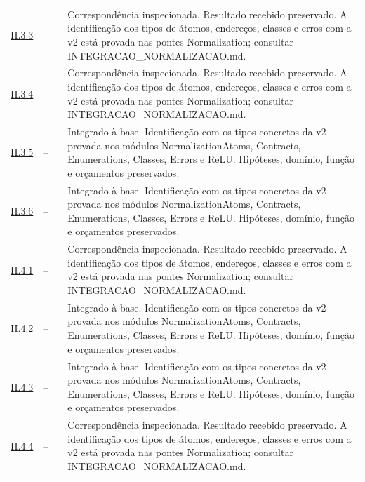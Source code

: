 \documentclass[12pt,a4paper]{article}
\theoremstyle{preciso}
\theoremstyle{definition}
\theoremstyle{preciso}
\theoremstyle{preciso}
\theoremstyle{preciso}
\theoremstyle{preciso}
\theoremstyle{definition}
\theoremstyle{preciso}
\theoremstyle{definition}
\theoremstyle{preciso}
\theoremstyle{preciso}
\theoremstyle{definition}
\begin{document}
\begin{singlespace}
\begin{longtable}{@{}p{.11\linewidth}p{.09\linewidth}p{.09\linewidth}p{.59\linewidth}@{}}
\hyperref[map:normalizacao:3.3]{II.3.3} & -- & \pageref{map:normalizacao:3.3} & Correspondência inspecionada. Resultado recebido preservado. A identificação dos tipos de átomos, endereços, classes e erros com a v2 está provada nas pontes Normalization; consultar INTEGRACAO\_NORMALIZACAO.md.\\[4pt]
\hyperref[map:normalizacao:3.4]{II.3.4} & -- & \pageref{map:normalizacao:3.4} & Correspondência inspecionada. Resultado recebido preservado. A identificação dos tipos de átomos, endereços, classes e erros com a v2 está provada nas pontes Normalization; consultar INTEGRACAO\_NORMALIZACAO.md.\\[4pt]
\hyperref[map:normalizacao:3.5]{II.3.5} & -- & \pageref{map:normalizacao:3.5} & Integrado à base. Identificação com os tipos concretos da v2 provada nos módulos NormalizationAtoms, Contracts, Enumerations, Classes, Errors e ReLU. Hipóteses, domínio, função e orçamentos preservados.\\[4pt]
\hyperref[map:normalizacao:3.6]{II.3.6} & -- & \pageref{map:normalizacao:3.6} & Integrado à base. Identificação com os tipos concretos da v2 provada nos módulos NormalizationAtoms, Contracts, Enumerations, Classes, Errors e ReLU. Hipóteses, domínio, função e orçamentos preservados.\\[4pt]
\hyperref[map:normalizacao:4.1]{II.4.1} & -- & \pageref{map:normalizacao:4.1} & Correspondência inspecionada. Resultado recebido preservado. A identificação dos tipos de átomos, endereços, classes e erros com a v2 está provada nas pontes Normalization; consultar INTEGRACAO\_NORMALIZACAO.md.\\[4pt]
\hyperref[map:normalizacao:4.2]{II.4.2} & -- & \pageref{map:normalizacao:4.2} & Integrado à base. Identificação com os tipos concretos da v2 provada nos módulos NormalizationAtoms, Contracts, Enumerations, Classes, Errors e ReLU. Hipóteses, domínio, função e orçamentos preservados.\\[4pt]
\hyperref[map:normalizacao:4.3]{II.4.3} & -- & \pageref{map:normalizacao:4.3} & Integrado à base. Identificação com os tipos concretos da v2 provada nos módulos NormalizationAtoms, Contracts, Enumerations, Classes, Errors e ReLU. Hipóteses, domínio, função e orçamentos preservados.\\[4pt]
\hyperref[map:normalizacao:4.4]{II.4.4} & -- & \pageref{map:normalizacao:4.4} & Correspondência inspecionada. Resultado recebido preservado. A identificação dos tipos de átomos, endereços, classes e erros com a v2 está provada nas pontes Normalization; consultar INTEGRACAO\_NORMALIZACAO.md.\\[4pt]

\end{longtable}
\end{singlespace}
\end{document}
